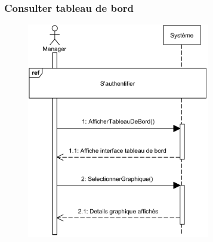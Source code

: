     \subsubsection[Consulter tableau de bord]{Consulter tableau de bord}
        \begin{figure}[H]
            \centering
            \includegraphics[width=80mm]{images/diagramme-de-sequence/sd-cons-dashboard.png}
            \label{fig:sdConTab}
        \end{figure}
\pagebreak
